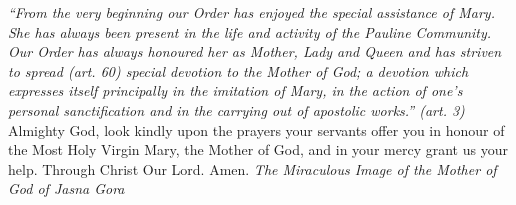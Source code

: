 \pagestyle{empty}
\hspace{0pt}
\vfill

\textit{``From the very beginning our Order has enjoyed
the special assistance of Mary. She has always been present
in the life and activity of the Pauline Community. Our Order
has always honoured her as Mother, Lady and Queen and
has striven to spread (art. 60) special devotion to the
Mother of God; a devotion which expresses itself principally
in the imitation of Mary, in the action of one's personal
sanctification and in the carrying out of apostolic
works.'' (art. 3)}
\medbreak
Almighty God, look kindly upon the prayers your
servants offer you in honour of the Most Holy Virgin Mary,
the Mother of God, and in your mercy grant us your help.
Through Christ Our Lord. Amen.
\vfill
\textit{The Miraculous Image of the Mother of God of Jasna Gora}
\hspace{0pt}
\newpage
